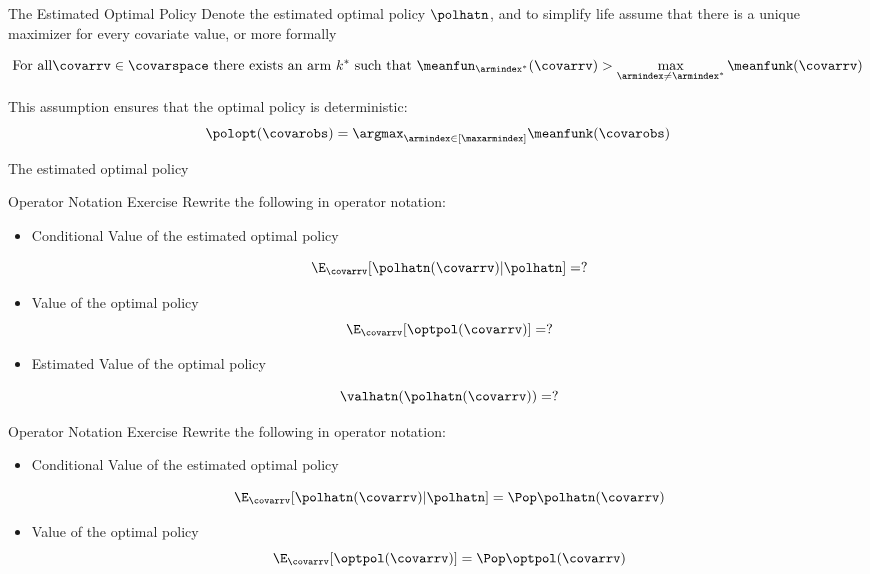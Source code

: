 \documentclass[aspectratio=169, professionalfonts]{beamer}
\begin{document}
\begin{frame}{The Estimated Optimal Policy}
	Denote the estimated optimal policy $\polhatn$, and to simplify life assume
	that there is a unique maximizer for every covariate value, or more formally

	$$\text{For all} \covarrv \in \covarspace \text{ there exists an arm }k^*
		\text{ such that } \meanfun_{\armindex^*}(\covarrv) > \max_{\armindex \neq
			\armindex^*} \meanfunk(\covarrv)$$

	\vfill \pause
	This assumption ensures that the optimal policy is deterministic:
	$$\polopt(\covarobs) = \argmax_{\armindex \in [\maxarmindex]}\meanfunk(\covarobs)$$

	The estimated optimal policy
\end{frame}


\begin{frame}{Operator Notation Exercise}
	Rewrite the following in operator notation:
	\vfill
	\begin{itemize}

		\item Conditional Value of the estimated optimal policy

		      $$\E_{\covarrv}[\polhatn(\covarrv) \vert \polhatn] = ?$$

		\item Value of the optimal policy
		      $$\E_{\covarrv}[\optpol(\covarrv)] = ?$$

		\item Estimated Value of the optimal policy

		      $$\valhatn(\polhatn(\covarrv)) = ?$$
	\end{itemize}
	\vfill

\end{frame}


\begin{frame}{Operator Notation Exercise}
	Rewrite the following in operator notation:
	\vfill
	\begin{itemize}

		\item Conditional Value of the estimated optimal policy

		      $$\E_{\covarrv}[\polhatn(\covarrv) \vert \polhatn] = \Pop \polhatn(\covarrv)$$

		\item Value of the optimal policy
		      $$\E_{\covarrv}[\optpol(\covarrv)] = \Pop \optpol(\covarrv)$$
	\end{itemize}
	\vfill

\end{frame}
\end{document}
